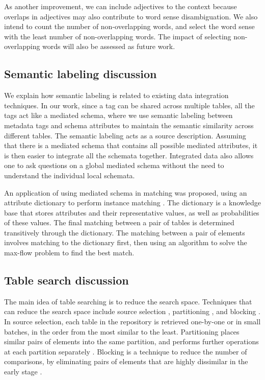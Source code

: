 As another improvement, we can include adjectives to the context because overlaps in adjectives may also contribute to word sense disambiguation. We also intend to count the number of non-overlapping words, and select the word sense with the least number of non-overlapping words. The impact of selecting non-overlapping words will also be assessed as future work.

\subsection{Semantic labeling discussion}

We explain how semantic labeling is related to existing data integration techniques. In our work, since a tag can be shared across multiple tables, all the tags act like a mediated schema, where we use semantic labeling between metadata tags and schema attributes to maintain the semantic similarity across different tables. The semantic labeling acts as a source description. Assuming that there is a mediated schema that contains all possible mediated attributes, it is then easier to integrate all the schemata together. Integrated data also allows one to ask questions on a global mediated schema without the need to understand the individual local schemata.

An application of using mediated schema in matching was proposed, using an attribute dictionary to perform instance matching \cite{DBLP:journals/pvldb/ChanialDGLNM18}. The dictionary is a knowledge base that stores attributes and their representative values, as well as probabilities of these values. The final matching between a pair of tables is determined transitively through the dictionary. The matching between a pair of elements involves matching to the dictionary first, then using an algorithm to solve the max-flow problem to find the best match.

\subsection{Table search discussion}

The main idea of table searching is to reduce the search space. Techniques that can reduce the search space include source selection \cite{Dong2012Proceedings}, partitioning \cite{Moawed2018Arabian}, and blocking \cite{Mudgal2018Deep}. In source selection, each table in the repository is retrieved one-by-one or in small batches, in the order from the most similar to the least. Partitioning places similar pairs of elements into the same partition, and performs further operations at each partition separately \cite{10.1145/1066157.1066283}. Blocking is a technique to reduce the number of comparisons, by eliminating pairs of elements that are highly dissimilar in the early stage \cite{Ehrig2004QOM}.

